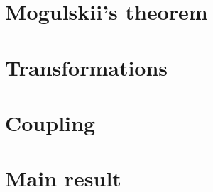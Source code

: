 

\section{Mogulskii's theorem}
\label{rate-functions:mogulskii}


\section{Transformations}
\label{rate-functions:transformations}


\section{Coupling}
\label{rate-functions:coupling}


\section{Main result}
\label{rate-functions:main}

